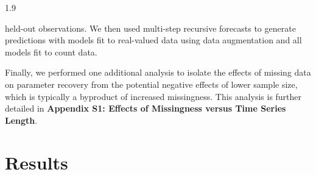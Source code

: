 \documentclass[12pt,english]{article} %
\begin{document}
\begin{linenumbers}
\begin{spacing}{1.9}
\begin{flushleft}
held-out observations. We then used multi-step recursive forecasts to generate predictions with models fit to real-valued data using data augmentation and all models fit to count data.


\hspace{1em} Finally, we performed one additional analysis to isolate the effects of missing data on parameter recovery from the potential negative effects of lower sample size, which is typically a byproduct of increased missingness. This analysis is further detailed in \textbf{Appendix S1: Effects of Missingness versus Time Series Length}.  
\vspace{-2.5em}
\section*{Results}
\vspace{-1.5em}



\end{flushleft}
\end{spacing}
\end{linenumbers}
\end{document}
